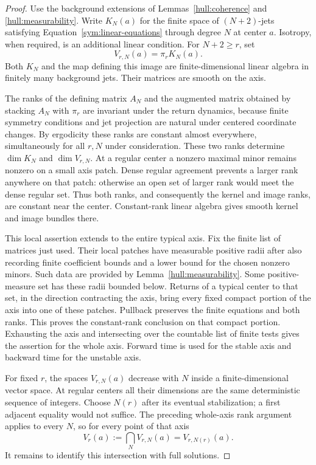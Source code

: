 \begin{proof}
Use the background extensions of Lemmas~\ref{hull:coherence} and
\ref{hull:measurability}.  Write $K_N(a)$ for the finite space of
$(N+2)$-jets satisfying Equation~\eqref{sym:linear-equations} through
degree $N$ at center $a$.  Isotropy, when required, is an additional
linear condition.  For $N+2\ge r$, set
\[
 V_{r,N}(a)=\pi_rK_N(a).
\]
Both $K_N$ and the map defining this image are finite-dimensional
linear algebra in finitely many background jets.  Their matrices
are smooth on the axis.

The ranks of the defining matrix $A_N$ and the augmented matrix
obtained by stacking $A_N$ with $\pi_r$ are invariant under the
return dynamics, because finite symmetry conditions and jet
projection are natural under centered coordinate changes.  By
ergodicity these ranks are constant almost everywhere,
simultaneously for all $r,N$ under consideration.  These two ranks
determine $\dim K_N$ and $\dim V_{r,N}$.  At a regular center a
nonzero maximal minor remains nonzero on a small axis patch.  Dense
regular agreement prevents a larger rank anywhere on that patch:
otherwise an open set of larger rank would meet the dense regular
set.  Thus both ranks, and consequently the kernel and image ranks,
are constant near the center.  Constant-rank linear algebra gives
smooth kernel and image bundles there.

This local assertion extends to the entire typical axis.  Fix the
finite list of matrices just used.  Their local patches have
measurable positive radii after also recording finite coefficient
bounds and a lower bound for the chosen nonzero minors.  Such data
are provided by Lemma~\ref{hull:measurability}.  Some positive-measure
set has these radii bounded below.  Returns of a typical center to
that set, in the direction contracting the axis, bring every fixed
compact portion of the axis into one of these patches.  Pullback
preserves the finite equations and both ranks.  This proves the
constant-rank conclusion on that compact portion.  Exhausting the
axis and intersecting over the countable list of finite tests gives
the assertion for the whole axis.  Forward time is used for the
stable axis and backward time for the unstable axis.

For fixed $r$, the spaces $V_{r,N}(a)$ decrease with $N$ inside a
finite-dimensional vector space.  At regular centers all their
dimensions are the same deterministic sequence of integers.  Choose
$N(r)$ after its eventual stabilization; a first adjacent equality
would not suffice.  The preceding whole-axis rank argument applies
to every $N$, so for every point of that axis
\begin{equation}
 \label{sym:stabilized-projection}
 V_r(a):=\bigcap_N V_{r,N}(a)=V_{r,N(r)}(a).
\end{equation}
It remains to identify this intersection with full solutions.


\end{proof}
